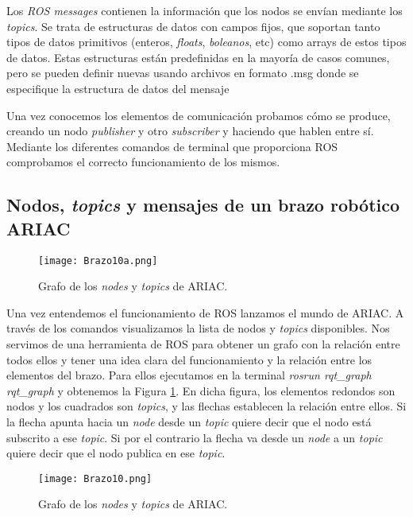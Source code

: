 Los \textit{ROS messages} contienen la información que los nodos se envían mediante los \textit{topics}. Se trata de estructuras de datos con campos fijos, que soportan tanto tipos de datos primitivos (enteros, \textit{floats}, \textit{boleanos}, etc) como arrays de estos tipos de datos. Estas estructuras están predefinidas en la mayoría de casos comunes, pero se pueden definir nuevas usando archivos en formato .msg donde se especifique la estructura de datos del mensaje

Una vez conocemos los elementos de comunicación probamos cómo se produce, creando un nodo \textit{publisher} y otro \textit{subscriber} y haciendo que hablen entre sí. Mediante los diferentes comandos de terminal que proporciona ROS comprobamos el correcto funcionamiento de los mismos. 

\subsection{Nodos, \textit{topics} y mensajes de un brazo robótico ARIAC}
\label{subsec:br_nododstopicsymensajes}

\begin{figure}[ht]
	\centering\texttt{[image: Brazo10a.png]}
	\caption{Grafo de los \textit{nodes} y \textit{topics} de ARIAC.}
	\label{fig:ariacgraph1}
\end{figure}

Una vez entendemos el funcionamiento de ROS lanzamos el mundo de ARIAC. A través de los comandos visualizamos la lista de nodos y \textit{topics} disponibles. Nos servimos de una herramienta de ROS para obtener un grafo con la relación entre todos ellos y tener una idea clara del funcionamiento y la relación entre los elementos del brazo. Para ellos ejecutamos en la terminal \textit{rosrun rqt\_graph rqt\_graph} y obtenemos la Figura \ref{fig:ariacgraph1}. En dicha figura, los elementos redondos son nodos y los cuadrados son \textit{topics}, y las flechas establecen la relación entre ellos. Si la flecha apunta hacia un \textit{node} desde un \textit{topic} quiere decir que el nodo está subscrito a ese \textit{topic}. Si por el contrario la flecha va desde un \textit{node} a un \textit{topic} quiere decir que el nodo publica en ese \textit{topic}.

\begin{figure}[hb]
	\centering\texttt{[image: Brazo10.png]}
	\caption{Grafo de los \textit{nodes} y \textit{topics} de ARIAC.}
	\label{fig:ariacgraph2}
\end{figure}

